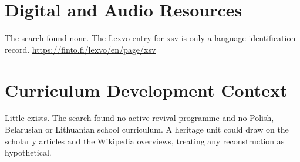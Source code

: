 \documentclass[12pt]{article}
\begin{document}
\section{Digital and Audio Resources}
The search found none. The Lexvo entry for xsv is only a language-identification record. \url{https://finto.fi/lexvo/en/page/xsv}

\section{Curriculum Development Context}
Little exists. The search found no active revival programme and no Polish, Belarusian or Lithuanian school curriculum. A heritage unit could draw on the scholarly articles and the Wikipedia overviews, treating any reconstruction as hypothetical.
\end{document}
